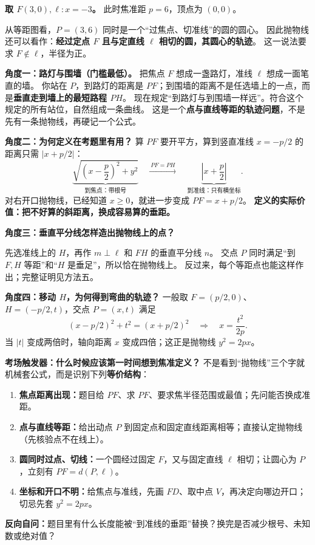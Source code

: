 \clearpage
\begin{explanationbox}
\textbf{取 $F(3,0),\ell:x=-3$。} 此时焦准距 $p=6$，顶点为 $(0,0)$。

从等距图看，$P=(3,6)$ 同时是一个“过焦点、切准线”的圆的圆心。
因此抛物线还可以看作：\textbf{经过定点 $F$ 且与定直线 $\ell$ 相切的圆，其圆心的轨迹}。
这一说法要求 $F\notin\ell$，半径为正。
\end{explanationbox}
\clearpage

\begin{explanationbox}
\textbf{角度一：路灯与围墙（门槛最低）。}
把焦点 $F$ 想成一盏路灯，准线 $\ell$ 想成一面笔直的墙。
你站在 $P$，到路灯的距离是 $PF$；到围墙的距离不是任选墙上的一点，而是\textbf{垂直走到墙上的最短路程 $PH$}。
现在规定“到路灯与到围墙一样远”。符合这个规定的所有站位，自然组成一条曲线。
这是一个\textbf{点与直线等距的轨迹问题}，不是先有一条抛物线，再硬记一个公式。

\medskip
\textbf{角度二：为何定义在考题里有用？}
算 $PF$ 要开平方，算到竖直准线 $x=-p/2$ 的距离只需 $|x+p/2|$：
\[
\underbrace{\sqrt{\left(x-\frac p2\right)^2+y^2}}_{\text{到焦点：带根号}}
\quad\xrightarrow{\ PF=PH\ }\quad
\underbrace{\left|x+\frac p2\right|}_{\text{到准线：只有横坐标}}.
\]
对右开口抛物线，已经知道 $x\ge0$，就进一步变成 $PF=x+p/2$。
\textbf{定义的实际价值：把不好算的斜距离，换成容易算的垂距。}

\medskip
\end{explanationbox}
\clearpage
\begin{explanationbox}
\textbf{角度三：垂直平分线怎样造出抛物线上的点？}

先选准线上的 $H$，再作 $m\perp\ell$ 和 $FH$ 的垂直平分线 $n$。
交点 $P$ 同时满足“到 $F,H$ 等距”和“$H$ 是垂足”，所以恰在抛物线上。
反过来，每个等距点也能这样作出；完整证明见方法五。

\medskip
\textbf{角度四：移动 $H$，为何得到弯曲的轨迹？}
一般取 $F=(p/2,0)$、$H=(-p/2,t)$，交点 $P=(x,t)$ 满足
\[
(x-p/2)^2+t^2=(x+p/2)^2
\quad\Longrightarrow\quad x=\frac{t^2}{2p}.
\]
当 $|t|$ 变成两倍时，轴向距离 $x$ 变成四倍；这正是抛物线 $y^2=2px$。
\end{explanationbox}
\clearpage
\begin{explanationbox}
\textbf{考场触发器：什么时候应该第一时间想到焦准定义？}
不是看到“抛物线”三个字就机械套公式，而是识别下列\textbf{等价结构}：
\begin{enumerate}
\item \textbf{焦点距离出现：}题目给 $PF$、求 $PF$、要求焦半径范围或最值；先问能否换成准距。
\item \textbf{点与直线等距：}给出动点 $P$ 到固定点和固定直线距离相等；直接认定抛物线（先核验点不在线上）。
\item \textbf{圆同时过点、切线：}一个圆经过固定 $F$，又与固定直线 $\ell$ 相切；让圆心为 $P$，立刻有 $PF=d(P,\ell)$。
\item \textbf{坐标和开口不明：}给焦点与准线，先画 $FD$、取中点 $V$，再决定向哪边开口；切忌先套 $y^2=2px$。
\end{enumerate}
\textbf{反向自问：}题目里有什么长度能被“到准线的垂距”替换？换完是否减少根号、未知数或绝对值？
\end{explanationbox}
